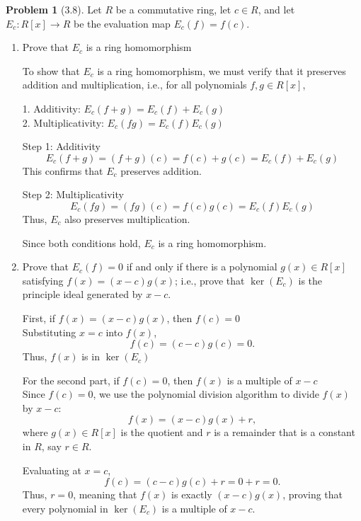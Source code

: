 \documentclass[12pt]{article}
\theoremstyle{definition}
\newtheorem{problem}{Problem}
\begin{document}
\begin{problem}[3.8]
    Let $R$ be a commutative ring, let $c \in R$, and let $E_c : R[x] \longrightarrow R$ be the evaluation map $E_c(f) = f(c)$.
    \begin{enumerate}[label=(\alph*)]
        \item Prove that $E_c$ is a ring homomorphism
              
              \begin{solution}
                To show that \( E_c \) is a ring homomorphism, we must verify that it preserves addition and multiplication, i.e., for all polynomials \( f, g \in R[x] \),

                1. Additivity: \( E_c(f + g) = E_c(f) + E_c(g) \)\\
                2. Multiplicativity: \( E_c(fg) = E_c(f) E_c(g) \)
  
                Step 1: Additivity
                \[
                    E_c(f + g) = (f + g)(c) = f(c) + g(c) = E_c(f) + E_c(g)
                \]
                This confirms that \( E_c \) preserves addition.
  
                Step 2: Multiplicativity
                \[
                    E_c(fg) = (fg)(c) = f(c) g(c) = E_c(f) E_c(g)
                \]
                Thus, \( E_c \) also preserves multiplication.
  
                Since both conditions hold, \( E_c \) is a ring homomorphism.
              \end{solution}
        \item Prove that $E_c(f) = 0$ if and only if there is a polynomial $g(x) \in R[x]$ satisfying $f(x) = (x - c)g(x)$; i.e.,
              prove that $\ker(E_c)$ is the principle ideal generated by $x - c$.

              \begin{solution}
                First, if \( f(x) = (x - c) g(x) \), then \( f(c) = 0 \) \\
                Substituting \( x = c \) into \( f(x) \),
                \[
                    f(c) = (c - c) g(c) = 0.
                \]
                Thus, \( f(x) \) is in \( \ker(E_c) \)
  
                For the second part, if \( f(c) = 0 \), then \( f(x) \) is a multiple of \( x - c \)\\
                Since \( f(c) = 0 \), we use the polynomial division algorithm to divide \( f(x) \) by \( x - c \):
                \[
                    f(x) = (x - c) g(x) + r,
                \]
                where \( g(x) \in R[x] \) is the quotient and \( r \) is a remainder that is a constant in \( R \), say \( r \in R \).
  
                Evaluating at \( x = c \),
                \[
                    f(c) = (c - c) g(c) + r = 0 + r = 0.
                \]
                Thus, \( r = 0 \), meaning that \( f(x) \) is exactly \( (x - c) g(x) \), proving that every polynomial in \( \ker(E_c) \) is a multiple of \( x - c \).
                
              \end{solution}
    \end{enumerate}
\end{problem}
\end{document}
